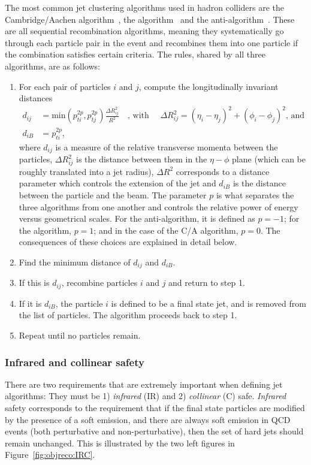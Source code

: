 The most common jet clustering algorithms used in hadron colliders are the Cambridge/Aachen algorithm~\cite{Dokshitzer:1997in}, the \kt algorithm~\cite{Ellis:1993tq} and the anti-\kt algorithm~\cite{Cacciari:2008gp}. These are all sequential recombination algorithms, meaning they systematically go through each particle pair in the event and recombines them into one particle if the combination satisfies certain criteria. The rules, shared by all three algorithms, are as follows:
\begin{enumerate}
  \itemsep0em 
\item For each pair of particles $i$ and $j$, compute the longitudinally invariant distances
  \begin{align}
    \label{eq:objreco:jetclustering1}  
  d_{ij} &= \textrm{min}(p_{ti}^{2p},p_{tj}^{2p})\frac{\Delta R^2_{ij}}{R^2} \quad \textrm{, with } \quad \Delta R^2_{ij}=(\eta_i - \eta_j)^2+(\phi_i - \phi_j)^2 \textrm{, and }\\
  \label{eq:objreco:jetclustering2}  
  d_{iB} &= p_{ti}^{2p},
  \end{align}  
  where $d_{ij}$ is a measure of the relative transverse momenta between the particles, $\Delta R^2_{ij}$ is the distance between them in the $\eta-\phi$ plane (which can be roughly translated into a jet radius), $\Delta R^2$ corresponds to a distance parameter which controls the extension of the jet and $d_{iB}$ is the distance between the particle and the beam. The parameter $p$ is what separates the three algorithms from one another and controls the relative power of energy versus geometrical
scales. For the anti-\kt algorithm, it is defined as $p=-1$; for the \kt algorithm, $p=1$; and in the case of the C/A algorithm, $p=0$. The consequences of these choices are explained in detail below.
  \item Find the minimum distance of $d_{ij}$ and $d_{iB}$.
  \item If this is $d_{ij}$, recombine particles $i$ and $j$ and return to step 1.
  \item If it is $d_{iB}$, the particle $i$ is defined to be a final state jet, and is removed from the list of particles. The algorithm proceeds back to step 1.
  \item Repeat until no particles remain.
\end{enumerate}

\subsubsection{Infrared and collinear safety}
There are two requirements that are extremely important when defining jet algorithms: They must be 1) \textit{infrared} (IR) and 2) \textit{collinear} (C) safe.
\textit{Infrared} safety corresponds to the requirement that if the final state particles are modified by the presence of a soft emission, and there are always soft emission in QCD events (both perturbative and non-perturbative), then the set of hard jets should remain unchanged. This is illustrated by the two left figures in Figure~\ref{fig:objreco:IRC}.

